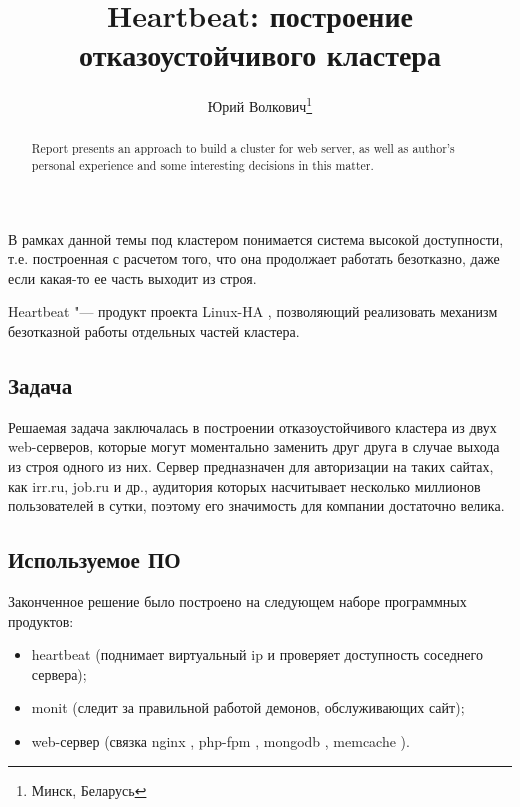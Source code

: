 \documentclass[10pt, a5paper]{article}
\begin{document}
\title{Heartbeat: построение отказоустойчивого кластера}%

\author{Юрий Волкович\footnote{Минск, Беларусь}}
\maketitle

\begin{abstract}
Report presents an approach to build a cluster for web server, as well as author's personal experience and some interesting decisions in this matter.
\end{abstract}

В рамках данной темы под кластером понимается система высокой доступности,
т.е. построенная с расчетом того, что она продолжает работать безотказно,
даже если какая-то ее часть выходит из строя.

Heartbeat "--- продукт проекта Linux-HA \cite{Volkovich1}, позволяющий реализовать механизм безотказной работы отдельных частей кластера.

\subsection*{Задача}

Решаемая задача заключалась в построении отказоустойчивого кластера из двух web-серверов, которые могут моментально заменить друг друга в случае выхода из строя одного из них. Сервер предназначен для авторизации на таких сайтах, как irr.ru, job.ru и др., аудитория которых насчитывает несколько миллионов пользователей в сутки, поэтому его значимость для компании достаточно велика.

\subsection*{Используемое ПО}

Законченное решение было построено на следующем наборе программных продуктов:

\begin{itemize}
  \item heartbeat (поднимает виртуальный ip и проверяет доступность соседнего сервера);
  \item monit \cite{Volkovich2} (следит за правильной работой демонов, обслуживающих сайт);
  \item web-сервер (связка nginx \cite{Volkovich3}, php-fpm \cite{Volkovich4}, mongodb \cite{Volkovich5}, \linebreak memcache \cite{Volkovich6}).
\end{itemize}
\end{document}
